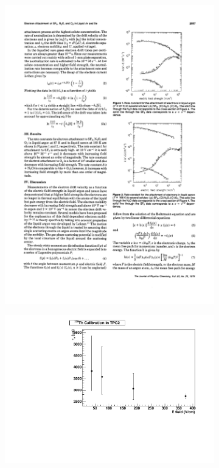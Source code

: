 \documentclass[herrin-thesis.tex]{subfiles}
\begin{document}
\begin{figure}[htb]
\centering
\begin{subfigure}[b]{0.35\linewidth}
\includegraphics[width=\textwidth]{./plots/el_attachment_vs_efield.pdf}
\end{subfigure}\hspace{0.05\linewidth}%
\begin{subfigure}[b]{0.55\linewidth}
\includegraphics[width=\textwidth]{./plots/el_lifetime_vs_efield.pdf}

\end{subfigure}
\end{figure}
\end{document}
